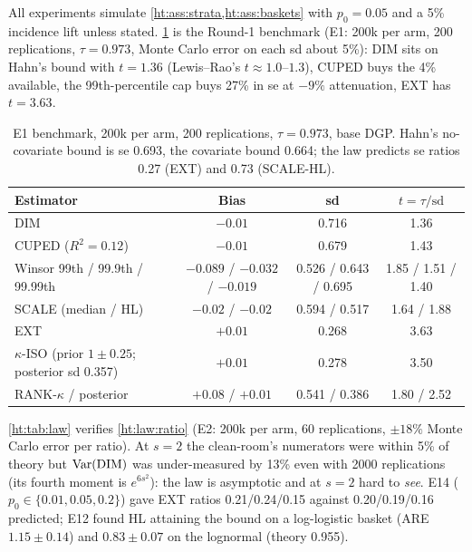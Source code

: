All experiments simulate \cref{ht:ass:strata,ht:ass:baskets} with $p_0 = 0.05$ and a 5\% incidence lift unless stated. \cref{ht:tab:bench} is the Round-1 benchmark (E1: 200k per arm, 200 replications, $\tau = 0.973$, Monte Carlo error on each sd about 5\%): DIM sits on Hahn's bound with $t = 1.36$ (Lewis--Rao's $t \approx 1.0$--$1.3$), CUPED buys the 4\% available, the 99th-percentile cap buys 27\% in se at $-9\%$ attenuation, EXT has $t = 3.63$.

\begin{table}[htbp]
\centering\small
\caption{E1 benchmark, 200k per arm, 200 replications, $\tau = 0.973$, base DGP. Hahn's no-covariate bound is se 0.693, the covariate bound 0.664; the law predicts se ratios 0.27 (EXT) and 0.73 (SCALE-HL).}
\label{ht:tab:bench}
\begin{tabular}{lccc}
\toprule
Estimator & Bias & sd & $t = \tau/\mathrm{sd}$ \\
\midrule
DIM & $-0.01$ & 0.716 & 1.36 \\
CUPED ($R^2 = 0.12$) & $-0.01$ & 0.679 & 1.43 \\
Winsor 99th / 99.9th / 99.99th & $-0.089$ / $-0.032$ / $-0.019$ & 0.526 / 0.643 / 0.695 & 1.85 / 1.51 / 1.40 \\
SCALE (median / HL) & $-0.02$ / $-0.02$ & 0.594 / 0.517 & 1.64 / 1.88 \\
EXT & $+0.01$ & 0.268 & 3.63 \\
$\kappa$-ISO (prior $1 \pm 0.25$; posterior sd 0.357) & $+0.01$ & 0.278 & 3.50 \\
RANK-$\kappa$ / posterior & $+0.08$ / $+0.01$ & 0.541 / 0.386 & 1.80 / 2.52 \\
\bottomrule
\end{tabular}
\end{table}

\cref{ht:tab:law} verifies \cref{ht:law:ratio} (E2: 200k per arm, 60 replications, $\pm18\%$ Monte Carlo error per ratio). At $s = 2$ the clean-room's numerators were within 5\% of theory but $\operatorname{Var}(\mathrm{DIM})$ was under-measured by 13\% even with 2000 replications (its fourth moment is $e^{6s^2}$): the law is asymptotic and at $s = 2$ hard to \emph{see}. E14 ($p_0 \in \{0.01, 0.05, 0.2\}$) gave EXT ratios 0.21/0.24/0.15 against 0.20/0.19/0.16 predicted; E12 found HL attaining the bound on a log-logistic basket (ARE $1.15 \pm 0.14$) and $0.83 \pm 0.07$ on the lognormal (theory 0.955).

